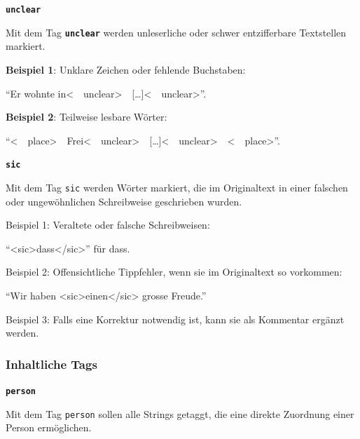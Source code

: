 \documentclass[12pt, a4paper, ngerman, bidi=default]{article}
\begin{document}
\begin{description}
\begin{description}
    
    \item \textbf{\colorbox{unclear}{\texttt{unclear}}}
    

    Mit dem Tag \texttt{\texttt{\textbf{{\colorbox{unclear}{unclear}}}}} werden unleserliche oder schwer entzifferbare Textstellen markiert. 

    
    \noindent\textbf{ Beispiel 1}: Unklare Zeichen oder fehlende Buchstaben: 

    \colorbox{VeryLightGray}{\enquote{Er wohnte in\textless\ \  unclear\textgreater\ \  [\ldots]\textless\ \  unclear\textgreater}.}

    \textbf{ Beispiel 2}: Teilweise lesbare Wörter:

    \colorbox{VeryLightGray}{\enquote{{\textless\ \  place\textgreater\ \  Frei\textless\ \  unclear\textgreater\ \  [\ldots]\textless\ \  unclear\textgreater\ \  \textless\ \  place\textgreater}}.}
    
    \item\texttt{\textbf{{\colorbox{sic}{sic}}}} 

    Mit dem Tag \texttt{sic} werden Wörter markiert, die im Originaltext in einer falschen oder ungewöhnlichen Schreibweise geschrieben wurden. 
    
    \noindent{} Beispiel 1: Veraltete oder falsche Schreibweisen: 

    \colorbox{VeryLightGray}{\enquote{{<sic>dass</sic>}} für dass.}

     Beispiel 2: Offensichtliche Tippfehler, wenn sie im Originaltext so vorkommen: 

    \colorbox{VeryLightGray}{\enquote{Wir haben {<sic>einen</sic>} grosse Freude.}}

     Beispiel 3: Falls eine Korrektur notwendig ist, kann sie als Kommentar ergänzt werden. 

    \end{description}

    \subsubsection{Inhaltliche Tags}
    \begin{description}
    \item\texttt{\textbf{{\colorbox{person}{person}}}}
        
    Mit dem Tag \texttt{\colorbox{person}{person}} sollen alle Strings getaggt, die eine direkte Zuordnung einer Person ermöglichen.
    

\end{description}
\end{description}
\end{document}
